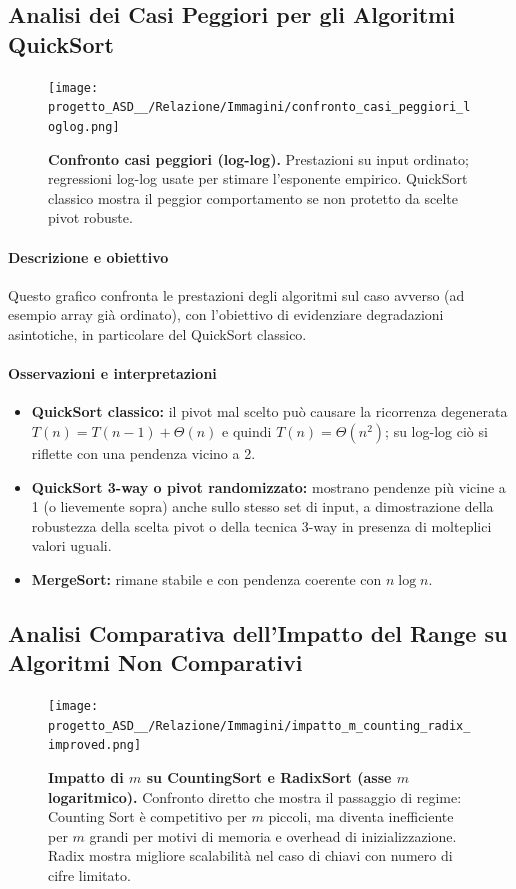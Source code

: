 \documentclass[a4paper, 11pt]{article}
\begin{document}
\subsection{Analisi dei Casi Peggiori per gli Algoritmi QuickSort}
\begin{figure}[H]
\centering
\texttt{[image: progetto\_ASD\_\_/Relazione/Immagini/confronto\_casi\_peggiori\_loglog.png]}
\caption{\textbf{Confronto casi peggiori (log-log).} Prestazioni su input ordinato; regressioni log-log usate per stimare l'esponente empirico. QuickSort classico mostra il peggior comportamento se non protetto da scelte pivot robuste.}
\label{fig:variazione_m}
\end{figure}

\paragraph{Descrizione e obiettivo}
Questo grafico confronta le prestazioni degli algoritmi sul caso avverso (ad esempio array già ordinato), con l'obiettivo di evidenziare degradazioni asintotiche, in particolare del QuickSort classico.

\paragraph{Osservazioni e interpretazioni}
\begin{itemize}
  \item \textbf{QuickSort classico:} il pivot mal scelto può causare la ricorrenza degenerata \(T(n)=T(n-1)+\Theta(n)\) e quindi \(T(n)=\Theta(n^2)\); su log-log ciò si riflette con una pendenza vicino a 2.
  \item \textbf{QuickSort 3-way o pivot randomizzato:} mostrano pendenze più vicine a 1 (o lievemente sopra) anche sullo stesso set di input, a dimostrazione della robustezza della scelta pivot o della tecnica 3-way in presenza di molteplici valori uguali.
  \item \textbf{MergeSort:} rimane stabile e con pendenza coerente con \(n\log n\).
\end{itemize}

\subsection{Analisi Comparativa dell'Impatto del Range su Algoritmi Non Comparativi}
\begin{figure}[H]
\centering
\texttt{[image: progetto\_ASD\_\_/Relazione/Immagini/impatto\_m\_counting\_radix\_improved.png]}
\caption{\textbf{Impatto di \(m\) su CountingSort e RadixSort (asse \(m\) logaritmico).} Confronto diretto che mostra il passaggio di regime: Counting Sort è competitivo per \(m\) piccoli, ma diventa inefficiente per \(m\) grandi per motivi di memoria e overhead di inizializzazione. Radix mostra migliore scalabilità nel caso di chiavi con numero di cifre limitato.}
\label{fig:variazione_m}
\end{figure}
\end{document}
